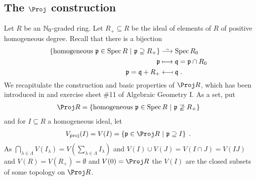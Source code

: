 \documentclass[a4paper,parskip=half,numbers=enddot, DIV=12]{scrreprt}
\begin{document}
\subsection{The \texorpdfstring{$\Proj$}{Proj} construction}
Let $R$ be an $\mathbb{N}_0$-graded ring. Let $R_+\subseteq R$ be the ideal of elements of $R$ of positive homogeneous degree. Recall that there is a bijection
\begin{align*}
	\left\{\text{homogeneous }\pp\in\Spec R\st \pp\supseteq R_+\right\}&\isomorphism \Spec R_0\\
	\pp&\longmapsto \qq=\pp\cap R_0\\
	\pp=\qq+R_+&\longmapsfrom \qq\;.
\end{align*}
We recapitulate the construction and basic properties of $\Proj R$, which has been introduced in \cite[Definition~2.6.2]{alggeo1} and exercise sheet \#11 of Algebraic Geometry I. As a set, put
\begin{align*}
	\Proj R=\left\{\text{homogeneous }\pp\in\Spec R\st \pp\not\supseteq R_+\right\}
\end{align*}
and for $I\subseteq R$ a homogeneous ideal, let
\begin{align*}
	V_\proj(I)=V(I)=\left\{\pp\in\Proj R\st \pp\supseteq I\right\}\;.
\end{align*}
As $\bigcap_{\lambda\in\Lambda}V(I_\lambda)=V\left(\sum_{\lambda\in\Lambda}I_\lambda\right)$ and $V(I)\cup V(J)=V(I\cap J)=V(IJ)$ and $V(R)=V(R_+)=\emptyset$ and $V(0)=\Proj R$ the $V(I)$ are the closed subsets of some topology on $\Proj R$.
\end{document}
